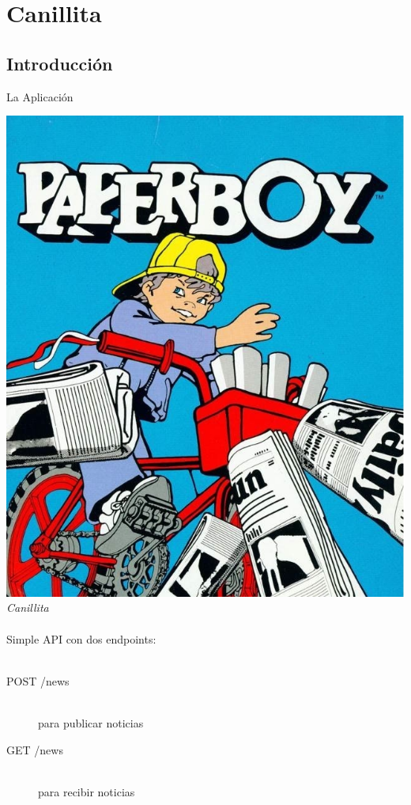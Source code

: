 \documentclass[utf8,hyperref={colorlinks=true}]{beamer}
\begin{document}
\section{Canillita}
\subsection{Introducci\'on}
\begin{frame}{La Aplicaci\'on}
\begin{multicols}{2}
\includegraphics[height=.8\textheight]{img/paperboy.jpg} \\
\columnbreak
	\alert{\textit{{\huge Canillita}}}
	\ \\
	\ \\
	Simple API con dos endpoints:
	\ \\
	\ \\
		\begin{description}
			\item[POST /news]\ \\ para publicar noticias
			\item[GET /news]\ \\ para recibir noticias
		\end{description}
\end{multicols}
\end{frame}
\end{document}
